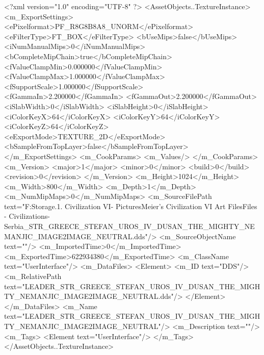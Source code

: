 <?xml version="1.0" encoding="UTF-8" ?>
<AssetObjects..TextureInstance>
	<m_ExportSettings>
		<ePixelformat>PF_R8G8B8A8_UNORM</ePixelformat>
		<eFilterType>FT_BOX</eFilterType>
		<bUseMips>false</bUseMips>
		<iNumManualMips>0</iNumManualMips>
		<bCompleteMipChain>true</bCompleteMipChain>
		<fValueClampMin>0.000000</fValueClampMin>
		<fValueClampMax>1.000000</fValueClampMax>
		<fSupportScale>1.000000</fSupportScale>
		<fGammaIn>2.200000</fGammaIn>
		<fGammaOut>2.200000</fGammaOut>
		<iSlabWidth>0</iSlabWidth>
		<iSlabHeight>0</iSlabHeight>
		<iColorKeyX>64</iColorKeyX>
		<iColorKeyY>64</iColorKeyY>
		<iColorKeyZ>64</iColorKeyZ>
		<eExportMode>TEXTURE_2D</eExportMode>
		<bSampleFromTopLayer>false</bSampleFromTopLayer>
	</m_ExportSettings>
	<m_CookParams>
		<m_Values/>
	</m_CookParams>
	<m_Version>
		<major>1</major>
		<minor>0</minor>
		<build>0</build>
		<revision>0</revision>
	</m_Version>
	<m_Height>1024</m_Height>
	<m_Width>800</m_Width>
	<m_Depth>1</m_Depth>
	<m_NumMipMaps>0</m_NumMipMaps>
	<m_SourceFilePath text="F:\Mod Storage\2.1. Civilization VI\Mods\Archive - Pictures\Sid Meier's Civilization VI Art Files\Art Files - Civilizations\Civilization - Serbia\LEADER_STR_GREECE_STEFAN_UROS_IV_DUSAN_THE_MIGHTY_NEMANJIC_IMAGE2IMAGE_NEUTRAL.dds"/>
	<m_SourceObjectName text=""/>
	<m_ImportedTime>0</m_ImportedTime>
	<m_ExportedTime>622934380</m_ExportedTime>
	<m_ClassName text="UserInterface"/>
	<m_DataFiles>
		<Element>
			<m_ID text="DDS"/>
			<m_RelativePath text="LEADER_STR_GREECE_STEFAN_UROS_IV_DUSAN_THE_MIGHTY_NEMANJIC_IMAGE2IMAGE_NEUTRAL.dds"/>
		</Element>
	</m_DataFiles>
	<m_Name text="LEADER_STR_GREECE_STEFAN_UROS_IV_DUSAN_THE_MIGHTY_NEMANJIC_IMAGE2IMAGE_NEUTRAL"/>
	<m_Description text=""/>
	<m_Tags>
		<Element text="UserInterface"/>
	</m_Tags>
</AssetObjects..TextureInstance>

